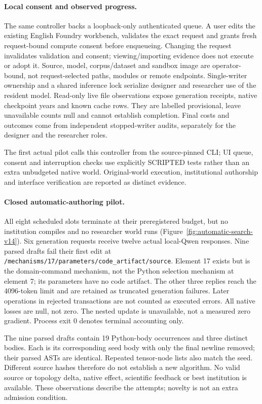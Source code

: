 \paragraph{Local consent and observed progress.}
The same controller backs a loopback-only authenticated queue. A user edits
the existing English Foundry workbench, validates the exact request and grants
fresh request-bound compute consent before enqueueing. Changing the request
invalidates validation and consent; viewing/importing evidence does not
execute or adopt it. Source, model, corpus/dataset and sandbox image are
operator-bound, not request-selected paths, modules or remote endpoints.
Single-writer ownership and a shared inference lock serialize designer and
researcher use of the resident model. Read-only live file observations expose
generation receipts, native checkpoint years and known cache rows. They are
labelled provisional, leave unavailable counts null and cannot establish
completion. Final costs and outcomes come from independent stopped-writer
audits, separately for the designer and the researcher roles.

The first actual pilot calls this controller from the source-pinned CLI; UI queue,
consent and interruption checks use explicitly SCRIPTED tests rather than an
extra unbudgeted native world. Original-world execution, institutional
authorship and interface verification are reported as distinct evidence.

\paragraph{Closed automatic-authoring pilot.}
All eight scheduled slots terminate at their preregistered budget, but no
institution compiles and no researcher world runs
(Figure~\ref{fig:automatic-search-v14}). Six generation requests receive twelve
actual local-Qwen responses. Nine parsed drafts fail their first edit at
\texttt{/mechanisms/17/parameters/code\_artifact/source}. Element 17 exists but
is the domain-command mechanism, not the Python selection mechanism at
element 7; its parameters have no code artifact. The other three replies reach
the 4096-token limit and are retained as truncated generation failures.
Later operations in rejected transactions are not counted as executed errors.
All native losses are null, not zero. The nested update is unavailable,
not a measured zero gradient. Process exit 0 denotes terminal accounting only.

The nine parsed drafts contain 19 Python-body occurrences and three distinct
bodies. Each is its corresponding seed body with only the final newline
removed; their parsed ASTs are identical. Repeated tensor-node lists also
match the seed. Different source hashes therefore do not establish a new
algorithm. No valid source or topology delta, native effect, scientific
feedback or best institution is available. These observations describe the
attempts; novelty is not an extra admission condition.

